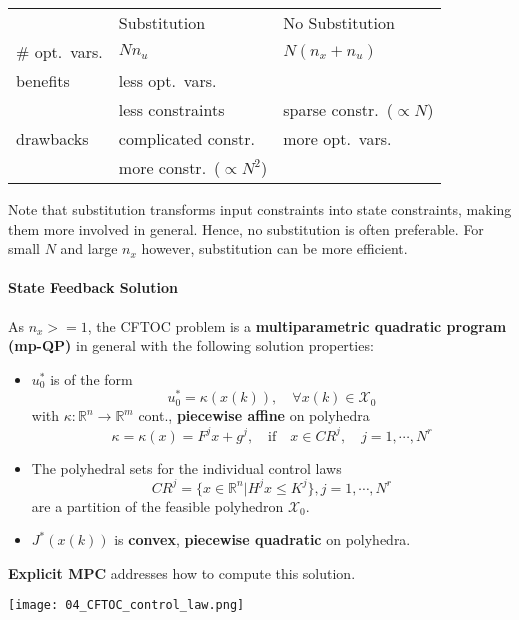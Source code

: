 \renewcommand{\arraystretch}{1.3}
\setlength{\oldtabcolsep}{\tabcolsep}\setlength\tabcolsep{6pt}
\begin{tabularx}{\linewidth}{@{}lll@{}}
                   & Substitution                  & No Substitution               \\
    \cmidrule{2-3}
    \# opt.\ vars. & $N n_u$                       & $N(n_x + n_u)$                \\
    benefits       & less opt.\ vars.              &                               \\
                   & less constraints              & sparse constr.\ ($\propto N$) \\
    drawbacks      & complicated constr.           & more opt.\ vars.              \\
                   & more constr.\ ($\propto N^2$) &                               %
\end{tabularx}
\renewcommand{\arraystretch}{1}
\setlength\tabcolsep{\oldtabcolsep}
Note that substitution transforms input constraints into state constraints, making them more involved in general. Hence, no substitution is often preferable. For small $N$ and large $n_x$ however, substitution can be more efficient.

\paragraph{State Feedback Solution}

As $n_x>=1$, the CFTOC problem is a \textbf{multiparametric quadratic program (mp-QP)} in general with the following solution properties:

\begin{itemize}
    \item $u_0^*$ is of the form
          \begin{equation*}
              u_0^*=\kappa(x(k)),\quad\forall x(k)\in\mathcal{X}_0
          \end{equation*}
          with $\kappa:\mathbb{R}^n \to \mathbb{R}^m$ cont., \textbf{piecewise affine} on polyhedra
          \begin{equation*}
              \kappa  =\kappa(x)=F^j x + g^j, \quad\mathrm{if}\quad x\in CR^j,\quad j=1,\cdots,N^r
          \end{equation*}
    \item The polyhedral sets for the individual control laws
          \begin{equation*}
              CR^j=\{x\in\mathbb{R}^n|H^j x\leq K^j\},j=1,\cdots,N^r
          \end{equation*}
          are a partition of the feasible polyhedron $\mathcal{X}_0$.
    \item $J^*(x(k))$ is \textbf{convex}, \textbf{piecewise quadratic} on polyhedra.
\end{itemize}
\textbf{Explicit MPC} addresses how to compute this solution.
\begin{center}
    \texttt{[image: 04\_CFTOC\_control\_law.png]}
\end{center}

